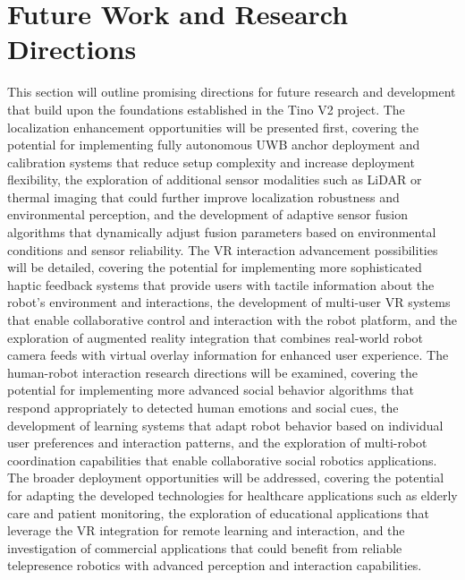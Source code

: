 \section{Future Work and Research Directions}
This section will outline promising directions for future research and development that build upon the foundations established in the Tino V2 project. The localization enhancement opportunities will be presented first, covering the potential for implementing fully autonomous UWB anchor deployment and calibration systems that reduce setup complexity and increase deployment flexibility, the exploration of additional sensor modalities such as LiDAR or thermal imaging that could further improve localization robustness and environmental perception, and the development of adaptive sensor fusion algorithms that dynamically adjust fusion parameters based on environmental conditions and sensor reliability. The VR interaction advancement possibilities will be detailed, covering the potential for implementing more sophisticated haptic feedback systems that provide users with tactile information about the robot's environment and interactions, the development of multi-user VR systems that enable collaborative control and interaction with the robot platform, and the exploration of augmented reality integration that combines real-world robot camera feeds with virtual overlay information for enhanced user experience. The human-robot interaction research directions will be examined, covering the potential for implementing more advanced social behavior algorithms that respond appropriately to detected human emotions and social cues, the development of learning systems that adapt robot behavior based on individual user preferences and interaction patterns, and the exploration of multi-robot coordination capabilities that enable collaborative social robotics applications. The broader deployment opportunities will be addressed, covering the potential for adapting the developed technologies for healthcare applications such as elderly care and patient monitoring, the exploration of educational applications that leverage the VR integration for remote learning and interaction, and the investigation of commercial applications that could benefit from reliable telepresence robotics with advanced perception and interaction capabilities.

